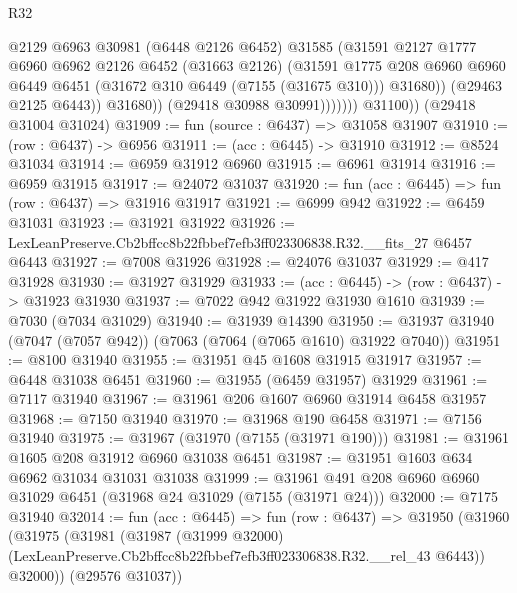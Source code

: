 \begin{lexlean}{R32}
\begin{coremodule}
                          @2129
                          @6963
                          @30981
                          (@6448 @2126 @6452)
                          @31585
                          (@31591
                            @2127
                            @1777
                            @6960
                            @6962
                            @2126
                            @6452
                            (@31663 @2126)
                            (@31591
                              @1775
                              @208
                              @6960
                              @6960
                              @6449
                              @6451
                              (@31672 @310 @6449 (@7155 (@31675 @310)))
                              @31680))
                          (@29463 @2125 @6443))
                        @31680))
                    (@29418 @30988 @30991)))))))
        @31100))
    (@29418 @31004 @31024)
@31909 := fun (source : @6437) => @31058 @31907
@31910 := (row : @6437) -> @6956
@31911 := (acc : @6445) -> @31910
@31912 := @8524 @31034
@31914 := @6959 @31912 @6960
@31915 := @6961 @31914
@31916 := @6959 @31915
@31917 := @24072 @31037
@31920 := fun (acc : @6445) => fun (row : @6437) => @31916 @31917
@31921 := @6999 @942
@31922 := @6459 @31031
@31923 := @31921 @31922
@31926 := LexLeanPreserve.Cb2bffcc8b22fbbef7efb3ff023306838.R32.__fits_27 @6457 @6443
@31927 := @7008 @31926
@31928 := @24076 @31037
@31929 := @417 @31928
@31930 := @31927 @31929
@31933 := (acc : @6445) -> (row : @6437) -> @31923 @31930
@31937 := @7022 @942 @31922 @31930 @1610
@31939 := @7030 (@7034 @31029)
@31940 := @31939 @14390
@31950 := @31937 @31940 (@7047 (@7057 @942)) (@7063 (@7064 (@7065 @1610) @31922 @7040))
@31951 := @8100 @31940
@31955 := @31951 @45 @1608 @31915 @31917
@31957 := @6448 @31038 @6451
@31960 := @31955 (@6459 @31957) @31929
@31961 := @7117 @31940
@31967 := @31961 @206 @1607 @6960 @31914 @6458 @31957
@31968 := @7150 @31940
@31970 := @31968 @190 @6458
@31971 := @7156 @31940
@31975 := @31967 (@31970 (@7155 (@31971 @190)))
@31981 := @31961 @1605 @208 @31912 @6960 @31038 @6451
@31987 := @31951 @1603 @634 @6962 @31034 @31031 @31038
@31999 := @31961 @491 @208 @6960 @6960 @31029 @6451 (@31968 @24 @31029 (@7155 (@31971 @24)))
@32000 := @7175 @31940
@32014 := fun (acc : @6445) =>
  fun (row : @6437) =>
  @31950
    (@31960
      (@31975
        (@31981
          (@31987
            (@31999 @32000)
            (LexLeanPreserve.Cb2bffcc8b22fbbef7efb3ff023306838.R32.__rel_43 @6443))
          @32000))
      (@29576 @31037))

\end{coremodule}
\end{lexlean}
